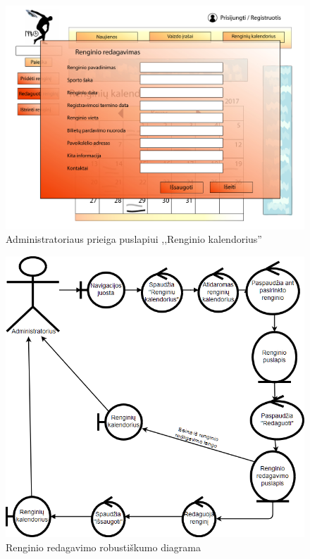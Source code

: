 \documentclass{VUMIFPSkursinis}
\begin{document}
\begin{enumerate} [label = \textbf{U\arabic*.}]
					\begin{figure}[H]
						\centering
						\includegraphics[width=\textwidth]{img/PSI4/AdminRenginioKalendorius-01.jpg}
						\caption{Administratoriaus prieiga puslapiui ,,Renginio kalendorius''}
						\label{fig:uzd_admin_renginioKalendorius}
					\end{figure}
					
					\begin{figure}[H]
						\centering
						\includegraphics[width=\textwidth]{img/PSI5/u23.png}
						\caption{Renginio redagavimo robustiškumo diagrama}
						\label{draw:u23}
					\end{figure}
				

\end{enumerate}
\end{document}
